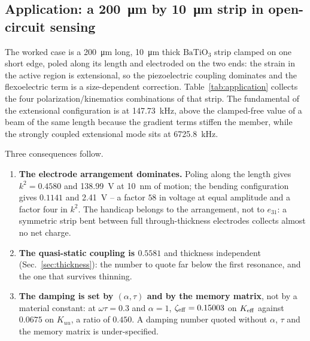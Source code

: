 \FloatBarrier
\subsection{Application: a \SI{200}{\micro\metre} by \SI{10}{\micro\metre}
strip in open-circuit sensing}
\label{sec:application}

The worked case is a \SI{200}{\micro\metre} long, \SI{10}{\micro\metre} thick
$\mathrm{BaTiO_3}$ strip clamped on one short edge, poled along its length and
electroded on the two ends: the strain in the active region is extensional, so
the piezoelectric coupling dominates and the flexoelectric term is a
size-dependent correction. Table~\ref{tab:application} collects the four
polarization/kinematics combinations of that strip. The fundamental of the
extensional configuration is at \SI{147.73}{kHz}, above the clamped-free value
of a beam of the same length because the gradient terms stiffen the member,
while the strongly coupled extensional mode sits at \SI{6725.8}{kHz}.

\begin{table}[!htbp]
\centering
\small
\caption{The same \SI{200}{\micro\metre}$\times$\SI{10}{\micro\metre}
strip in four polarization/kinematics combinations: the coupling of the
strongest mode, its frequency and the open-circuit voltage at
\SI{10}{\nano\metre} of tip motion. The two plane-stress rows are the
configurations of Fig.~\ref{fig:geometry}; they are not additive.}
\label{tab:application}

\end{table}

Three consequences follow.

\begin{enumerate}
\item \textbf{The electrode arrangement dominates.} Poling along the length
  gives $k^2=0.4580$ and \SI{138.99}{\volt} at \SI{10}{\nano\metre} of motion;
  the bending configuration gives $0.1141$ and \SI{2.41}{\volt} -- a factor
  $58$ in voltage at equal amplitude and a factor four in $k^2$. The handicap
  belongs to the arrangement, not to $e_{31}$: a symmetric strip bent between
  full through-thickness electrodes collects almost no net charge.
\item \textbf{The quasi-static coupling is $0.5581$} and thickness independent
  (Sec.~\ref{sec:thickness}): the number to quote far below the first
  resonance, and the one that survives thinning.
\item \textbf{The damping is set by $(\alpha,\tau)$ and by the memory matrix},
  not by a material constant: at $\omega\tau=0.3$ and $\alpha=1$,
  $\zeta_{\rm eff}=0.15003$ on $K_{\rm eff}$ against $0.0675$ on $K_{uu}$, a
  ratio of $0.450$. A damping number quoted without $\alpha$, $\tau$ and the
  memory matrix is under-specified.
\end{enumerate}

\FloatBarrier
